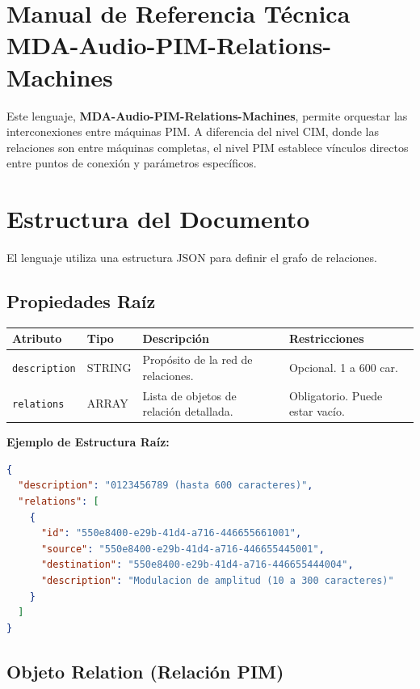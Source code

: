 \section{Manual de Referencia Técnica MDA-Audio-PIM-Relations-Machines}

Este lenguaje, \textbf{MDA-Audio-PIM-Relations-Machines}, permite orquestar las interconexiones entre máquinas PIM. A diferencia del nivel CIM, donde las relaciones son entre máquinas completas, el nivel PIM establece vínculos directos entre puntos de conexión y parámetros específicos.

\section{Estructura del Documento}

El lenguaje utiliza una estructura JSON para definir el grafo de relaciones.

\subsection{Propiedades Raíz}

\begin{table}[H]
\centering
\small
\begin{tabular}{@{}llp{5cm}l@{}}
\toprule
Atributo & Tipo & Descripción & Restricciones \\ \midrule
\texttt{description} & STRING & Propósito de la red de relaciones. & Opcional. 1 a 600 car. \\
\texttt{relations} & ARRAY & Lista de objetos de relación detallada. & Obligatorio. Puede estar vacío. \\ \bottomrule
\end{tabular}
\end{table}

\textbf{Ejemplo de Estructura Raíz:}
\begin{lstlisting}[language=json]
{
  "description": "0123456789 (hasta 600 caracteres)",
  "relations": [
    {
      "id": "550e8400-e29b-41d4-a716-446655661001",
      "source": "550e8400-e29b-41d4-a716-446655445001",
      "destination": "550e8400-e29b-41d4-a716-446655444004",
      "description": "Modulacion de amplitud (10 a 300 caracteres)"
    }
  ]
}
\end{lstlisting}

\subsection{Objeto Relation (Relación PIM)}

